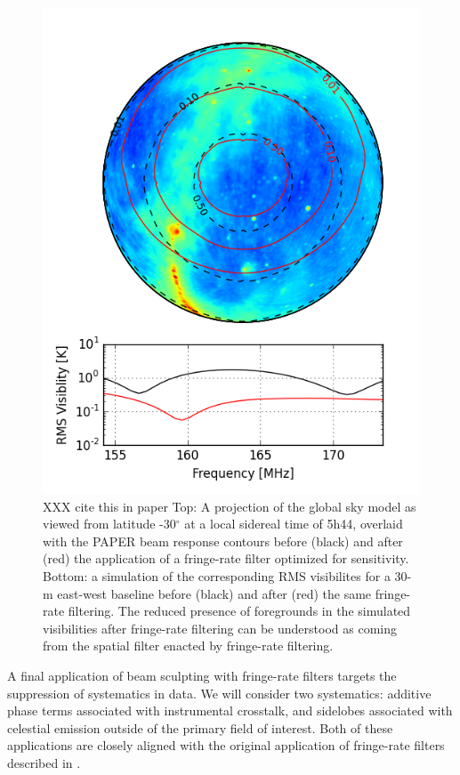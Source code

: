 \documentclass[twocolumn,apj,numberedappendix]{emulateapj}
\begin{document}
\begin{figure}\centering
\includegraphics[width=.9\columnwidth]{plots/gsm.png}
\caption{
XXX cite this in paper
Top: A projection of the global sky model \citep{deoliviera_et_al2008} as viewed from
latitude -30$^\circ$ at a local sidereal time of 5h44, overlaid with the 
PAPER beam response contours before (black) and after (red) the application of a fringe-rate filter
optimized for sensitivity.  
Bottom: a simulation of the corresponding RMS visibilites for a 30-m east-west baseline before (black) and
after (red) the same fringe-rate filtering.
The reduced presence of foregrounds in the simulated visibilities after fringe-rate filtering
can be understood as coming from the spatial filter enacted by fringe-rate filtering.
}\label{fig:gsm}
\end{figure}


A final application of beam sculpting with fringe-rate filters targets the suppression of systematics in data.
We will consider two systematics: additive phase terms associated with instrumental crosstalk, and sidelobes
associated with celestial emission outside of the primary field of interest.  Both of these applications are 
closely aligned with the original application of fringe-rate filters described in \citet{parsons_backer2009}.
\end{document}
